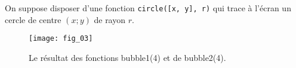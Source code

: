 %
%
%
%
%
%
%
%


\setcounter{question}{0}
On suppose disposer d’une fonction \lstinline{circle([x, y], r)} qui trace à l’écran un cercle de centre
$(x;y)$ de rayon $r$. 



\begin{figure}[!h]
\centering
\texttt{[image: fig\_03]}
\caption{Le résultat des fonctions bubble1(4) et de bubble2(4).}
\end{figure}



